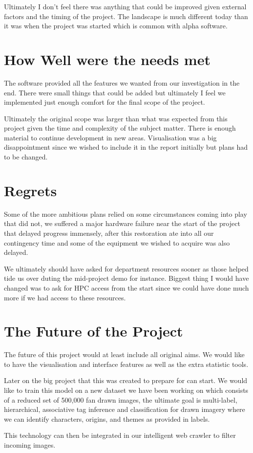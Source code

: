Ultimately I don't feel there was anything that could be improved given external factors and the timing of the project. The landscape is much different today than it was when the project was started which is common with alpha software.

\section{How Well were the needs met}
The software provided all the features we wanted from our investigation in the end. There were small things that could be added but ultimately I feel we implemented just enough comfort for the final scope of the project.

Ultimately the original scope was larger than what was expected from this project given the time and complexity of the subject matter. There is enough material to continue development in new areas. Visualisation was a big disappointment since we wished to include it in the report initially but plans had to be changed.

\section{Regrets}
Some of the more ambitious plans relied on some circumstances coming into play that did not, we suffered a major hardware failure near the start of the project that delayed progress immensely, after this restoration ate into all our contingency time and some of the equipment we wished to acquire was also delayed.

We ultimately should have asked for department resources sooner as those helped tide us over duting the mid-project demo for instance. Biggest thing I would have changed was to ask for HPC access from the start since we could have done much more if we had access to these resources.

\section{The Future of the Project}
The future of this project would at least include all original aims. We would like to have the visualisation and interface features as well as the extra statistic tools.

Later on the big project that this was created to prepare for can start. We would like to train this model on a new dataset we have been working on which consists of a reduced set of 500,000 fan drawn images, the ultimate goal is multi-label, hierarchical, associative tag inference and classification for drawn imagery where we can identify characters, origins, and themes as provided in labels.

This technology can then be integrated in our intelligent web crawler to filter incoming images.